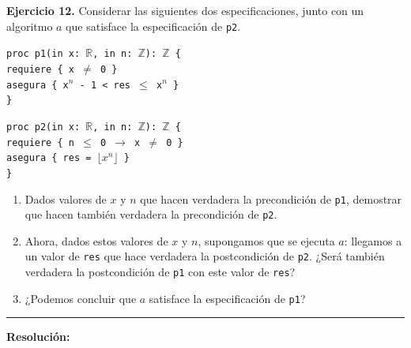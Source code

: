\hypertarget{ej12}{}
\noindent \textbf{Ejercicio 12.} Considerar las siguientes dos especificaciones, junto con un algoritmo $a$ que satisface la especificación de \texttt{p2}.

\vspace{0.2cm}

\noindent \texttt{proc p1(in x: $\mathbb{R}$, in n: $\mathbb{Z}$): $\mathbb{Z}$ \{} \\
\texttt{\hspace*{0.5cm}requiere \{ x $\neq$ 0 \}} \\
\texttt{\hspace*{0.5cm}asegura \{ x$^n$ - 1 < res $\leq$ x$^n$ \}} \\
\texttt{\}}

\vspace{0.2cm}

\noindent \texttt{proc p2(in x: $\mathbb{R}$, in n: $\mathbb{Z}$): $\mathbb{Z}$ \{} \\
\texttt{\hspace*{0.5cm}requiere \{ n $\leq$ 0 $\rightarrow$ x $\neq$ 0 \}} \\
\texttt{\hspace*{0.5cm}asegura \{ res = $\lfloor x^n \rfloor$ \}} \\
\texttt{\}}

\vspace{0.2cm}

\begin{enumerate}[label=\alph*)]
    \item Dados valores de $x$ y $n$ que hacen verdadera la precondición de \texttt{p1}, demostrar que hacen también verdadera la precondición de \texttt{p2}.
    \item Ahora, dados estos valores de $x$ y $n$, supongamos que se ejecuta $a$: llegamos a un valor de \texttt{res} que hace verdadera la postcondición de \texttt{p2}. ¿Será también verdadera la postcondición de \texttt{p1} con este valor de \texttt{res}?
    \item ¿Podemos concluir que $a$ satisface la especificación de \texttt{p1}?
\end{enumerate}

\vspace{0.2cm}
{\color{gray}\hrule}
\vspace{0.4cm}

\textbf{Resolución:}

